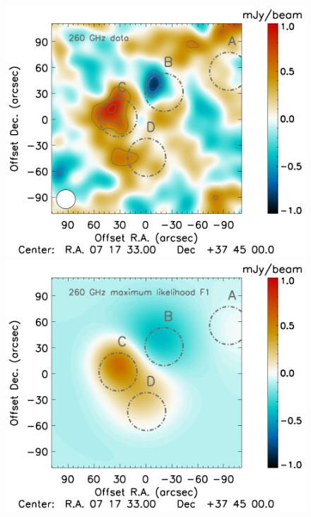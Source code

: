 \documentclass[twocolumn,traditabstract]{aa}
\begin{document}
\begin{figure}[h]
\centering
\includegraphics[trim=0cm 0.7cm 3.33cm 0cm, clip=true, totalheight=4cm]{Figure/MCMC_data_1mm_ksz2.pdf}
\includegraphics[trim=2.3cm 0.7cm 3.33cm 0cm, clip=true, totalheight=4cm]{Figure/MCMC_best_fit_1mm_ksz2_F1.pdf}

\end{figure}
\end{document}
